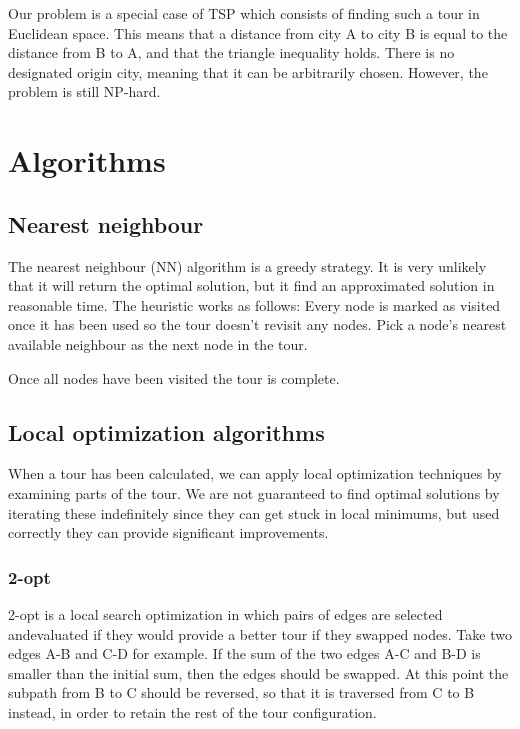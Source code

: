\documentclass[paper=a4, fontsize=11pt,numbers=endperiod]{scrartcl} %
\numberwithin{equation}{section} %
\numberwithin{figure}{section} %
\numberwithin{table}{section} %
\begin{document}
Our problem is a special case of TSP which consists of finding such a tour in Euclidean space. This means that a distance from city A to city B is equal to the distance from B to A, and that the triangle inequality holds. There is no designated origin city, meaning that it can be arbitrarily chosen.
However, the problem is still NP-hard.

\section{Algorithms}

\subsection{Nearest neighbour}
The nearest neighbour (NN) algorithm is a greedy strategy. It is very unlikely that it will return the optimal solution, but it find an approximated solution in reasonable time.
The heuristic works as follows: 
Every node is marked as visited once it has been used so the tour doesn't revisit any nodes.
Pick a node's nearest available neighbour as the next node in the tour.

Once all nodes have been visited the tour is complete.

\subsection{}

\subsection{Local optimization algorithms}
When a tour has been calculated, we can apply local optimization techniques by examining parts of the tour. We are not guaranteed to find optimal solutions by iterating these indefinitely since they can get stuck in local minimums, but used correctly they can provide significant improvements.

\subsubsection{2-opt}
2-opt is a local search optimization in which pairs of edges are selected andevaluated if they would provide a better tour if they swapped nodes.
Take two edges A-B and C-D for example.
If the sum of the two edges A-C and B-D is smaller than the initial sum, then the edges should be swapped.
At this point the subpath from B to C should be reversed, so that it is traversed from C to B instead, in order to retain the rest of the tour configuration.
\end{document}

